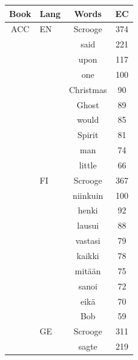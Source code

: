 \documentclass[shortpaper]{revdetua}
\begin{document}
\begin{table}[H]
\centering
\begin{tabular}{@{}cccc@{}}
\toprule
\textbf{Book} & \multicolumn{1}{l|}{\textbf{Lang}} & \textbf{Words} & \textbf{EC} \\ \midrule
ACC  & \multicolumn{1}{l|}{EN}      & Scrooge     & 374       \\
        & \multicolumn{1}{l|}{}     & said        & 221       \\
        & \multicolumn{1}{l|}{}     & upon        & 117       \\
        & \multicolumn{1}{l|}{}     & one         & 100       \\
        & \multicolumn{1}{l|}{}     & Christmas   & 90        \\
        & \multicolumn{1}{l|}{}     & Ghost       & 89        \\
        & \multicolumn{1}{l|}{}     & would       & 85        \\
        & \multicolumn{1}{l|}{}     & Spirit      & 81        \\
        & \multicolumn{1}{l|}{}     & man         & 74        \\
        & \multicolumn{1}{l|}{}     & little      & 66        \\ \cmidrule(l){2-4} 
        & \multicolumn{1}{l|}{FI}   & Scrooge     & 367       \\
        & \multicolumn{1}{l|}{}     & niinkuin    & 100       \\
        & \multicolumn{1}{l|}{}     & henki       & 92        \\
        & \multicolumn{1}{l|}{}     & lausui      & 88        \\
        & \multicolumn{1}{l|}{}     & vastasi     & 79        \\
        & \multicolumn{1}{l|}{}     & kaikki      & 78        \\
        & \multicolumn{1}{l|}{}     & mitään      & 75        \\
        & \multicolumn{1}{l|}{}     & sanoi       & 72        \\
        & \multicolumn{1}{l|}{}     & eikä        & 70        \\
        & \multicolumn{1}{l|}{}     & Bob         & 59        \\ \cmidrule(l){2-4} 
        & \multicolumn{1}{l|}{GE}   & Scrooge     & 311       \\
        & \multicolumn{1}{l|}{}     & sagte       & 219       \\

\end{tabular}
\end{table}
\end{document}
